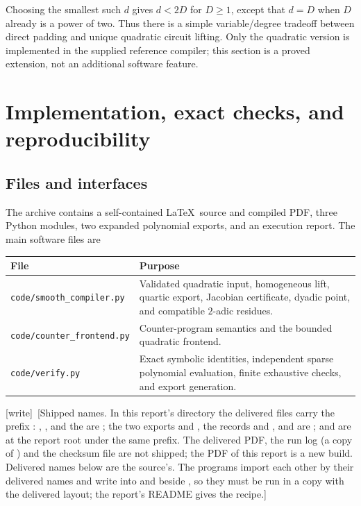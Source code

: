 \documentclass[11pt,a4paper]{article}
\theoremstyle{definition}
\theoremstyle{remark}
\newcommand{\wtag}{\textup{[write]}}
\begin{document}
Choosing the smallest such $d$ gives $d<2D$ for $D\ge1$, except that
$d=D$ when $D$ already is a power of two. Thus there is a simple
variable/degree tradeoff between direct padding and unique quadratic
circuit lifting. Only the quadratic version is implemented in the supplied
reference compiler; this section is a proved extension, not an additional
software feature.

\section{Implementation, exact checks, and reproducibility}\label{sdf:sec:implementation}

\subsection{Files and interfaces}

The archive contains a self-contained \LaTeX\ source and compiled PDF,
three Python modules, two expanded polynomial exports, and an execution
report. The main software files are
\begin{center}
\begin{tabular}{p{}p{}}
\toprule
File & Purpose\\
\midrule
\texttt{code/smooth\_compiler.py} & Validated quadratic input, homogeneous lift,
quartic export, Jacobian certificate, dyadic point, and compatible
$2$-adic residues.\\
\texttt{code/counter\_frontend.py} & Counter-program semantics and the bounded
quadratic frontend.\\
\texttt{code/verify.py} & Exact symbolic identities, independent sparse
polynomial evaluation, finite exhaustive checks, and export generation.\\
\bottomrule
\end{tabular}
\end{center}

\wtag\ [Shipped names. In this report's directory the delivered files carry
the prefix : ,
,  and the
 are ; the two exports
 and , the
records  and
, and  are
;  and
 are at the report root under the same prefix. The
delivered PDF, the run log (a copy of ) and the checksum
file are not shipped; the PDF of this report is a new build. Delivered names
below are the source's. The programs import each other by their delivered
names and write into  and  beside
, so they must be run in a copy with the delivered layout; the
report's README gives the recipe.]
\end{document}
